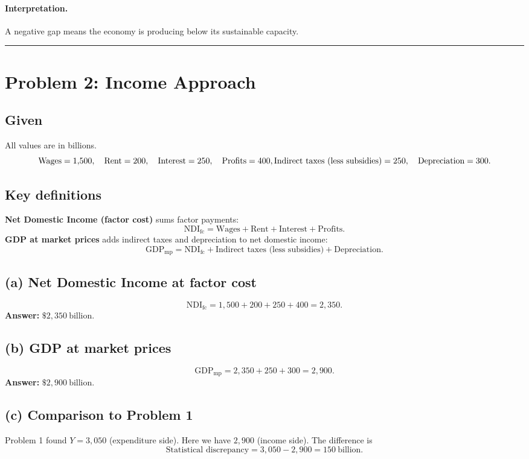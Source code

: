 \documentclass[11pt]{article}
\newcommand{\defn}[1]{\textbf{#1}}
\newcommand{\bn}{\vspace{0.25em}\noindent}
\begin{document}
\paragraph{Interpretation.}
A negative gap means the economy is producing below its sustainable capacity.

\bigskip
\hrule
\bigskip

\section*{Problem 2: Income Approach}

\subsection*{Given}
All values are in billions.
\[
\text{Wages}=1{,}500,\quad \text{Rent}=200,\quad \text{Interest}=250,\quad \text{Profits}=400,\\
\text{Indirect taxes (less subsidies)}=250,\quad \text{Depreciation}=300.
\]

\subsection*{Key definitions}
\bn \defn{Net Domestic Income (factor cost)} sums factor payments:
\[
\text{NDI}_{\text{fc}} = \text{Wages}+\text{Rent}+\text{Interest}+\text{Profits}.
\]
\defn{GDP at market prices} adds indirect taxes and depreciation to net domestic income:
\[
\text{GDP}_{\text{mp}} = \text{NDI}_{\text{fc}} + \text{Indirect taxes (less subsidies)} + \text{Depreciation}.
\]

\subsection*{(a) Net Domestic Income at factor cost}
\[
\text{NDI}_{\text{fc}} = 1{,}500 + 200 + 250 + 400 = 2{,}350.
\]
\textbf{Answer:} \(\boxed{\$2{,}350\ \text{billion}}\).

\subsection*{(b) GDP at market prices}
\[
\text{GDP}_{\text{mp}} = 2{,}350 + 250 + 300 = 2{,}900.
\]
\textbf{Answer:} \(\boxed{\$2{,}900\ \text{billion}}\).

\subsection*{(c) Comparison to Problem 1}
Problem 1 found \(Y=3{,}050\) (expenditure side). Here we have \(2{,}900\) (income side). The difference is
\[
\text{Statistical discrepancy} = 3{,}050 - 2{,}900 = 150\ \text{billion}.
\]
\end{document}
